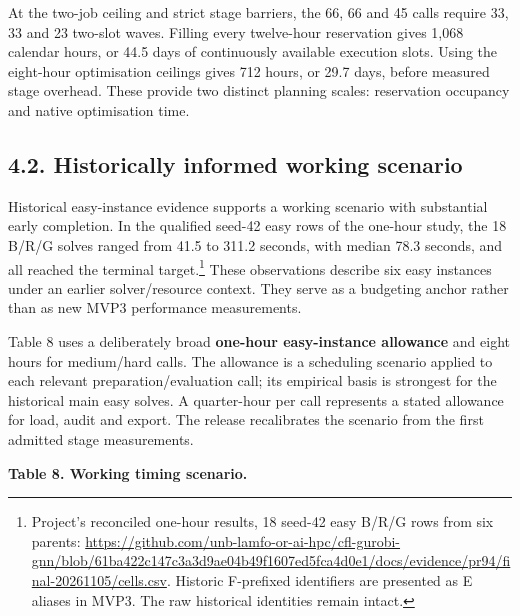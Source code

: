 \documentclass[
  british,
  10pt,
]{article}
\begin{document}
At the two-job ceiling and strict stage barriers, the 66, 66 and 45
calls require 33, 33 and 23 two-slot waves. Filling every twelve-hour
reservation gives 1,068 calendar hours, or 44.5 days of continuously
available execution slots. Using the eight-hour optimisation ceilings
gives 712 hours, or 29.7 days, before measured stage overhead. These
provide two distinct planning scales: reservation occupancy and native
optimisation time.

\subsection{4.2. Historically informed working
scenario}\label{historically-informed-working-scenario}

Historical easy-instance evidence supports a working scenario with
substantial early completion. In the qualified seed-42 easy rows of the
one-hour study, the 18 B/R/G solves ranged from 41.5 to 311.2 seconds,
with median 78.3 seconds, and all reached the terminal
target.\footnote{Project's reconciled one-hour results, 18 seed-42 easy
  B/R/G rows from six parents:
  \url{https://github.com/unb-lamfo-or-ai-hpc/cfl-gurobi-gnn/blob/61ba422c147c3a3d9ae04b49f1607ed5fca4d0e1/docs/evidence/pr94/final-20261105/cells.csv}.
  Historic F-prefixed identifiers are presented as E aliases in MVP3.
  The raw historical identities remain intact.} These observations
describe six easy instances under an earlier solver/resource context.
They serve as a budgeting anchor rather than as new MVP3 performance
measurements.

Table 8 uses a deliberately broad \textbf{one-hour easy-instance
allowance} and eight hours for medium/hard calls. The allowance is a
scheduling scenario applied to each relevant preparation/evaluation
call; its empirical basis is strongest for the historical main easy
solves. A quarter-hour per call represents a stated allowance for load,
audit and export. The release recalibrates the scenario from the first
admitted stage measurements.


\textbf{Table 8. Working timing scenario.}
\end{document}
